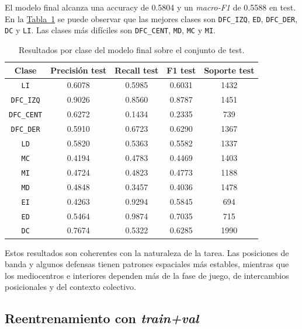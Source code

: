 El modelo final alcanza una accuracy de 0.5804 y un \textit{macro-F1} de 0.5588 en test. En la \hyperref[tab:set_transformer_test_by_class]{Tabla~\ref*{tab:set_transformer_test_by_class}} se puede observar que las mejores clases son \texttt{DFC\_IZQ}, \texttt{ED}, \texttt{DFC\_DER}, \texttt{DC} y \texttt{LI}. Las clases más difíciles son \texttt{DFC\_CENT}, \texttt{MD}, \texttt{MC} y \texttt{MI}.

\begin{table}[H]
\centering
\scriptsize
\begin{tabular}{c|c|c|c|c}
\textbf{Clase} & \textbf{Precisión test} & \textbf{Recall test} & \textbf{F1 test} & \textbf{Soporte test} \\
\hline\hline
\texttt{LI} & 0.6078 & 0.5985 & 0.6031 & 1432 \\
\hline
\texttt{DFC\_IZQ} & 0.9026 & 0.8560 & 0.8787 & 1451 \\
\hline
\texttt{DFC\_CENT} & 0.6272 & 0.1434 & 0.2335 & 739 \\
\hline
\texttt{DFC\_DER} & 0.5910 & 0.6723 & 0.6290 & 1367 \\
\hline
\texttt{LD} & 0.5820 & 0.5363 & 0.5582 & 1337 \\
\hline
\texttt{MC} & 0.4194 & 0.4783 & 0.4469 & 1403 \\
\hline
\texttt{MI} & 0.4724 & 0.4823 & 0.4773 & 1188 \\
\hline
\texttt{MD} & 0.4848 & 0.3457 & 0.4036 & 1478 \\
\hline
\texttt{EI} & 0.4263 & 0.9294 & 0.5845 & 694 \\
\hline
\texttt{ED} & 0.5464 & 0.9874 & 0.7035 & 715 \\
\hline
\texttt{DC} & 0.7674 & 0.5322 & 0.6285 & 1990 \\
\hline
\end{tabular}
\caption{Resultados por clase del modelo final sobre el conjunto de test.}
\label{tab:set_transformer_test_by_class}
\end{table}

Estos resultados son coherentes con la naturaleza de la tarea. Las posiciones de banda y algunos defensas tienen patrones espaciales más estables, mientras que los mediocentros e interiores dependen más de la fase de juego, de intercambios posicionales y del contexto colectivo.

\subsection{Reentrenamiento con \textit{train+val}}
\label{subsec:reentrenamiento-train-val-posicional}

